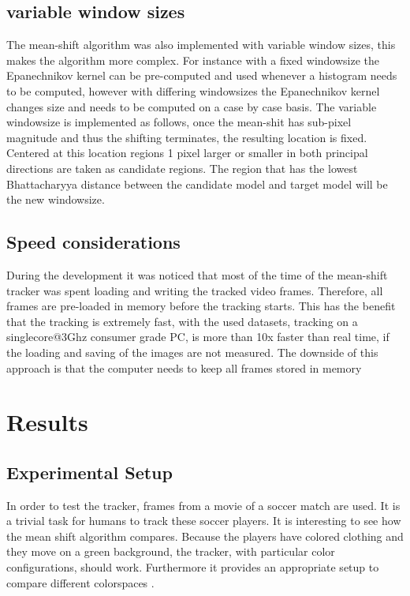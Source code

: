 \documentclass[a4paper,11pt]{article}
\begin{document}
\subsection{variable window sizes}
The mean-shift algorithm was also implemented with variable window sizes, this makes the algorithm more complex. For instance with a fixed windowsize the Epanechnikov kernel can be pre-computed and used whenever a histogram needs to be computed, however with differing windowsizes the Epanechnikov kernel changes size and needs to be computed on a case by case basis. The variable windowsize is implemented as follows, once the mean-shit has sub-pixel magnitude and thus the shifting terminates, the resulting location is fixed. Centered at this location regions 1 pixel larger or smaller in both principal directions are taken as candidate regions. The region that has the lowest Bhattacharyya distance between the candidate model and target model will be the new windowsize.     
  
\subsection{Speed considerations}
During the development it was noticed that most of the time of the mean-shift tracker was spent loading and writing the tracked video frames. Therefore, all frames are pre-loaded in memory before the tracking starts. This has the benefit that the tracking is extremely fast, with the used datasets, tracking on a singlecore@3Ghz consumer grade PC, is more than 10x faster than real time, if the loading and saving of the images are not measured. The downside of this approach is that the computer needs to keep all frames stored in memory 




\section{Results} 
	\subsection{Experimental Setup} 
	In order to test the tracker, frames from a movie of a soccer match are
	used.  It is a trivial task for humans to track these soccer players. It is
	interesting to see how the mean shift algorithm compares.  Because the
	players have colored clothing and they move on a green background, the
	tracker, with particular color configurations, should work. Furthermore it
	provides an appropriate setup to compare different colorspaces .\\
\end{document}
